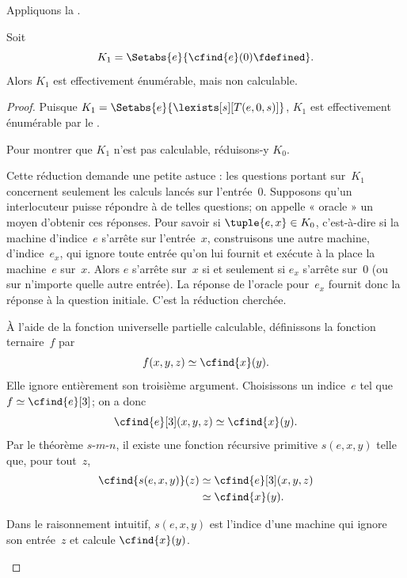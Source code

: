 \documentclass[../../../include/open-logic-section]{subfiles}
\begin{document}

Appliquons la .

\begin{prop}
Soit
\[
K_1 = \Setabs{e}{\cfind{e}(0) \fdefined}.
\]
Alors $K_1$ est effectivement énumérable,
mais non calculable.
\end{prop}

\begin{proof}
Puisque
$K_1=\Setabs{e}{\lexists[s][T(e,0,s)]}$,
$K_1$ est effectivement énumérable par le
.

Pour montrer que $K_1$ n'est pas calculable,
réduisons-y $K_0$.

\begin{explain}
Cette réduction demande une petite astuce :
les questions portant sur~$K_1$ concernent
seulement les calculs lancés sur l'entrée~$0$.
Supposons qu'un interlocuteur puisse répondre
à de telles questions; on appelle « oracle »
un moyen d'obtenir ces réponses. Pour savoir
si $\tuple{e,x}\in K_0$, c'est-à-dire si la
machine d'indice~$e$ s'arrête sur l'entrée~$x$,
construisons une autre machine, d'indice~$e_x$,
qui ignore toute entrée qu'on lui fournit et
exécute à la place la machine~$e$ sur~$x$.
Alors $e$ s'arrête sur~$x$ si et seulement si
$e_x$ s'arrête sur~$0$ (ou sur n'importe
quelle autre entrée). La réponse de l'oracle
pour~$e_x$ fournit donc la réponse à la
question initiale. C'est la réduction cherchée.
\end{explain}

À l'aide de la fonction universelle partielle
calculable, définissons la fonction ternaire~$f$
par
\[
f(x,y,z) \simeq \cfind{x}(y).
\]
Elle ignore entièrement son troisième argument.
Choisissons un indice~$e$ tel que
$f\simeq\cfind{e}[3]$; on a donc
\[
\cfind{e}[3](x,y,z) \simeq \cfind{x}(y).
\]
Par le théorème $s$-$m$-$n$, il existe une
fonction récursive primitive $s(e,x,y)$ telle que,
pour tout~$z$,
\begin{align*}
\cfind{s(e,x,y)}(z) & \simeq \cfind{e}[3](x,y,z) \\
& \simeq \cfind{x}(y).
\end{align*}

\begin{explain}
Dans le raisonnement intuitif, $s(e,x,y)$
est l'indice d'une machine qui ignore son
entrée~$z$ et calcule $\cfind{x}(y)$.
\end{explain}


\end{proof}
\end{document}
